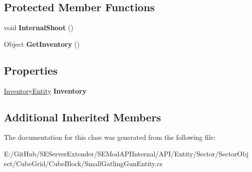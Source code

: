 \subsection*{Protected Member Functions}
\begin{DoxyCompactItemize}
\item 
\hypertarget{class_s_e_mod_a_p_i_internal_1_1_a_p_i_1_1_entity_1_1_sector_1_1_sector_object_1_1_cube_grid_1_1da7f6e1e443b7b445548fcb53da9dcdc_ab3c20c49e39d253a20a3d1bc2408e24b}{}void {\bfseries Internal\+Shoot} ()\label{class_s_e_mod_a_p_i_internal_1_1_a_p_i_1_1_entity_1_1_sector_1_1_sector_object_1_1_cube_grid_1_1da7f6e1e443b7b445548fcb53da9dcdc_ab3c20c49e39d253a20a3d1bc2408e24b}

\item 
\hypertarget{class_s_e_mod_a_p_i_internal_1_1_a_p_i_1_1_entity_1_1_sector_1_1_sector_object_1_1_cube_grid_1_1da7f6e1e443b7b445548fcb53da9dcdc_a6efe7b8ca4e5e7f13df1de3a423071be}{}Object {\bfseries Get\+Inventory} ()\label{class_s_e_mod_a_p_i_internal_1_1_a_p_i_1_1_entity_1_1_sector_1_1_sector_object_1_1_cube_grid_1_1da7f6e1e443b7b445548fcb53da9dcdc_a6efe7b8ca4e5e7f13df1de3a423071be}

\end{DoxyCompactItemize}
\subsection*{Properties}
\begin{DoxyCompactItemize}
\item 
\hypertarget{class_s_e_mod_a_p_i_internal_1_1_a_p_i_1_1_entity_1_1_sector_1_1_sector_object_1_1_cube_grid_1_1da7f6e1e443b7b445548fcb53da9dcdc_a121830907334c10bfa49bf6a73bd2327}{}\hyperlink{class_s_e_mod_a_p_i_internal_1_1_a_p_i_1_1_entity_1_1_inventory_entity}{Inventory\+Entity} {\bfseries Inventory}\label{class_s_e_mod_a_p_i_internal_1_1_a_p_i_1_1_entity_1_1_sector_1_1_sector_object_1_1_cube_grid_1_1da7f6e1e443b7b445548fcb53da9dcdc_a121830907334c10bfa49bf6a73bd2327}

\end{DoxyCompactItemize}
\subsection*{Additional Inherited Members}


The documentation for this class was generated from the following file\+:\begin{DoxyCompactItemize}
\item 
E\+:/\+Git\+Hub/\+S\+E\+Server\+Extender/\+S\+E\+Mod\+A\+P\+I\+Internal/\+A\+P\+I/\+Entity/\+Sector/\+Sector\+Object/\+Cube\+Grid/\+Cube\+Block/Small\+Gatling\+Gun\+Entity.\+cs\end{DoxyCompactItemize}
